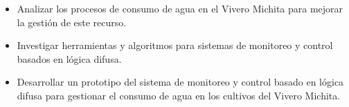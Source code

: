 \begin{itemize}
    \item Analizar los procesos de consumo de agua en el Vivero Michita para mejorar la gestión de este recurso.
    \item Investigar herramientas y algoritmos para sistemas de monitoreo y control basados en lógica difusa.
    \item Desarrollar un prototipo del sistema de monitoreo y control basado en lógica difusa para gestionar el consumo de agua en los cultivos del Vivero Michita.
\end{itemize}